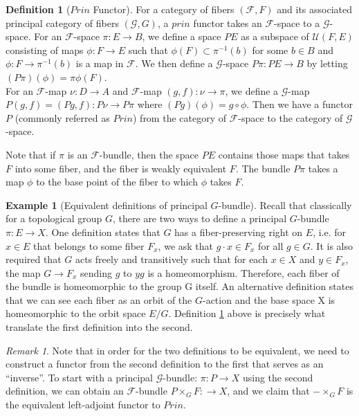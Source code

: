 \documentclass[psamsfonts]{amsart}
\theoremstyle{definition}
\newtheorem{defn}[thm]{Definition}
\newtheorem{exmp}[thm]{Example}
\theoremstyle{remark}
\newtheorem{rem}[thm]{Remark}
\numberwithin{equation}{section}
\begin{document}
\begin{defn}[$Prin$ Functor]
\label{def:prin}
For a category of fibers $(\mathcal{F}, F)$ and its associated principal category of fibers $(\mathcal{G}, G)$, a $prin$ functor takes an $\mathcal{F}$-space to a $\mathcal{G}$-space. For an $\mathcal{F}$-space $\pi: E \rightarrow B$, we define a space $PE$ as a subspace of $\mathcal{U}(F, E)$ consisting of maps $\phi: F \rightarrow E$ such that $\phi(F) \subset \pi^{-1}(b)$ for some $b \in B$ and $\phi: F \rightarrow \pi^{-1}(b)$ is a map in $\mathcal{F}$. We then define a $\mathcal{G}$-space $P\pi: PE \rightarrow B$ by letting $(P\pi)(\phi) = \pi\phi(F)$.\\
For an $\mathcal{F}$-map $\nu: D \rightarrow A$ and $\mathcal{F}$-map $(g, f): \nu \rightarrow \pi$, we define a $\mathcal{G}$-map $P(g, f) = (Pg, f): P\nu \rightarrow P\pi$ where $(Pg)(\phi) = g \circ \phi$. Then we have a functor $P$ (commonly referred as $Prin$) from the category of $\mathcal{F}$-space to the category of $\mathcal{G}$-space.
\end{defn}

Note that if $\pi$ is an $\mathcal{F}$-bundle, then the space $PE$ contains those maps that takes $F$ into some fiber, and the fiber is weakly equivalent $F$. The bundle $P\pi$ takes a map $\phi$ to the base point of the fiber to which $\phi$ takes $F$.

\begin{exmp}[Equivalent definitions of principal $G$-bundle]
Recall that classically for a topological group $G$, there are two ways to define a principal $G$-bundle $\pi: E \to X$. One definition states that $G$ has a fiber-preserving right on $E$, i.e. for $x \in E$ that belongs to some fiber $F_{x}$, we ask that $g \cdot x \in F_{x}$ for all $g \in G$. It is also required that $G$ acts freely and transitively such that for each $x \in X$ and $y \in F_{x}$, the map $G \to F_{x}$ sending $g$ to $yg$ is a homeomorphism. Therefore, each fiber of the bundle is homeomorphic to the group G itself. An alternative definition states that we can see each fiber as an orbit of the $G$-action and the base space X is homeomorphic to the orbit space $E/G$. Definition \ref{def:prin} above is precisely what translate the first definition into the second.
\end{exmp}

\begin{rem}
\label{rem:prin}
Note that in order for the two definitions to be equivalent, we need to construct a functor from the second definition to the first that serves as an ``inverse''. To start with a principal $\mathcal{G}$-bundle: $\pi: P \to X$ using the second definition, we can obtain an $\mathcal{F}$-bundle $P \times_{G} F: \to X$, and we claim that $- \times_{G} F$ is the equivalent left-adjoint functor to $Prin$.
\end{rem}
\end{document}
